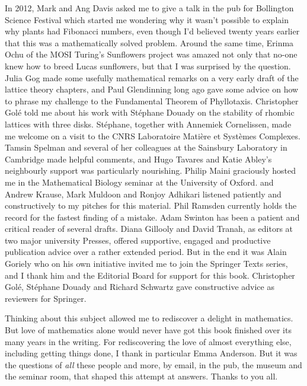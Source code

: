 


In 2012, Mark and Ang Davis asked me to give a talk in the pub for Bollington Science Festival which started me wondering why it wasn't possible to explain why plants had Fibonacci numbers, even though I'd believed twenty years earlier that this was a mathematically solved problem. Around the same time, Erinma Ochu of the MOSI Turing's Sunflowers project was amazed not only that no-one knew how to breed Lucas sunflowers, but that I was surprised by the question.  
Julia Gog  made some usefully mathematical remarks on a very early draft of the lattice theory chapters, and  Paul Glendinning  long ago gave some advice on how to phrase my challenge to the Fundamental Theorem of Phyllotaxis.
Christopher Golé told me about his work with Stéphane Douady on the stability of rhombic lattices with three disks. Stéphane, together with  Annemiek Cornelissen, made me welcome on a visit to the CNRS Laboratoire Matière et Systèmes Complexes. Tamsin Spelman and several of her colleagues at the Sainsbury Laboratory in Cambridge made helpful comments, and Hugo Tavares and Katie Abley's neighbourly support was particularly nourishing.   Philip Maini graciously hosted me in the Mathematical Biology seminar at the University of Oxford. and Andrew Krause, Mark Muldoon and Ronjoy Adhikari listened patiently and constructively to my pitches for this material. Phil Ramsden currently holds the record for the fastest finding of a mistake.  Adam Swinton has been a patient and critical reader of several drafts. 
Diana Gillooly and David Tranah, as editors at two major university Presses,  offered supportive, engaged and productive publication advice over a rather extended period. But in the end it was Alain Goriely who on his own initiative invited me to join the Springer Texts series, and I thank him and the Editorial Board for support for this book. Christopher Golé, Stéphane Douady and Richard Schwartz gave constructive advice as reviewers for Springer. 


Thinking about this subject allowed me to rediscover a delight in mathematics. But love of mathematics alone would never have got this book finished over its many years in the writing. For rediscovering the love of almost everything else, including getting things done, I thank in particular Emma Anderson. But it was the questions  of \textit{all} these people and more, by email, in the pub, the museum and the seminar room, that shaped this attempt at answers.  Thanks to you all. 


